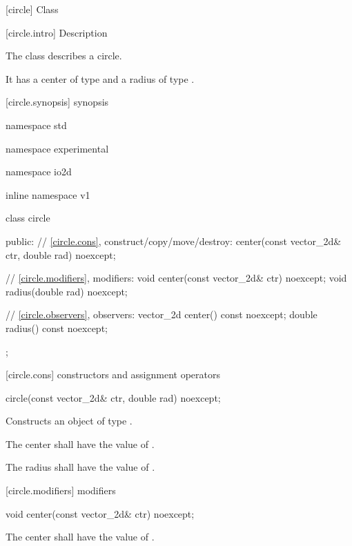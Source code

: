  [circle] {Class }

 [circle.intro] { Description}

\pnum
{}
The class  describes a circle.

\pnum
It has a center of type  and a radius of type .

 [circle.synopsis] { synopsis}

\begin{codeblock}
namespace std { namespace experimental { namespace io2d { inline namespace v1 {
  class circle {
  public:
    // \ref{circle.cons}, construct/copy/move/destroy:
    center(const vector_2d& ctr, double rad) noexcept;

    // \ref{circle.modifiers}, modifiers:
    void center(const vector_2d& ctr) noexcept;
    void radius(double rad) noexcept;
    
    // \ref{circle.observers}, observers:
    vector_2d center() const noexcept;
    double radius() const noexcept;
  };
} } } }
\end{codeblock}

 [circle.cons] { constructors and assignment operators}

\begin{itemdecl}
circle(const vector_2d& ctr, double rad) noexcept;
\end{itemdecl}
\begin{itemdescr}
	\pnum
	\effects
	Constructs an object of type .
	
	\pnum
	The center shall have the value of .
	
	\pnum
	The radius shall have the value of .
\end{itemdescr}

 [circle.modifiers]{ modifiers}

\begin{itemdecl}
void center(const vector_2d& ctr) noexcept;
\end{itemdecl}

\begin{itemdescr}
	\pnum
	\effects
	The center shall have the value of .
\end{itemdescr}

